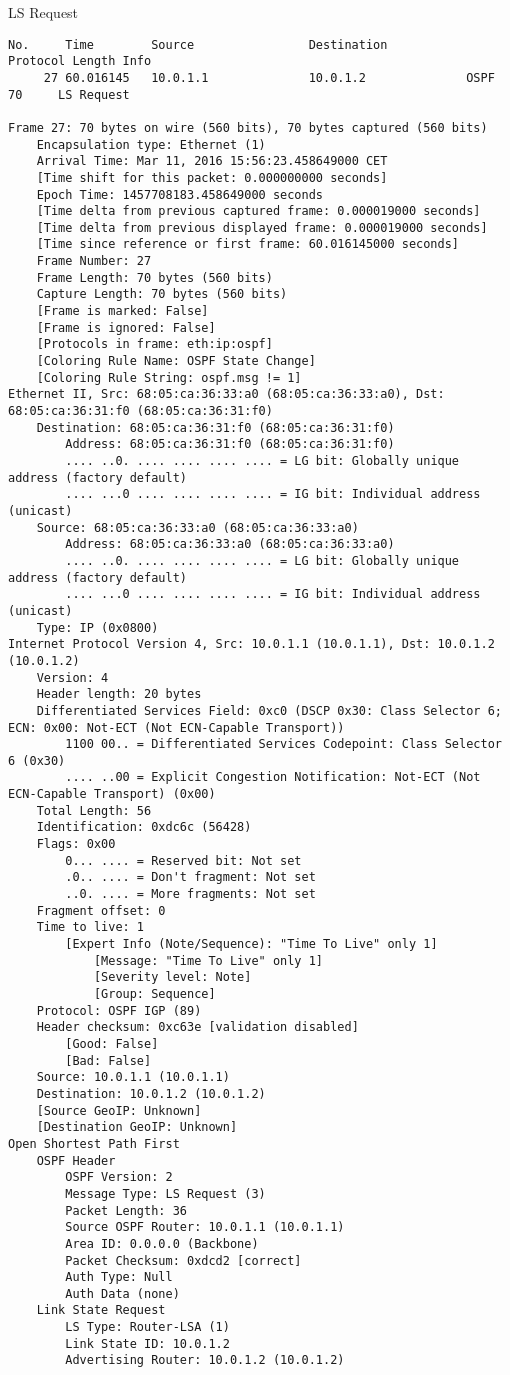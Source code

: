LS Request
\begin{lstlisting}
No.     Time        Source                Destination           Protocol Length Info
     27 60.016145   10.0.1.1              10.0.1.2              OSPF     70     LS Request

Frame 27: 70 bytes on wire (560 bits), 70 bytes captured (560 bits)
    Encapsulation type: Ethernet (1)
    Arrival Time: Mar 11, 2016 15:56:23.458649000 CET
    [Time shift for this packet: 0.000000000 seconds]
    Epoch Time: 1457708183.458649000 seconds
    [Time delta from previous captured frame: 0.000019000 seconds]
    [Time delta from previous displayed frame: 0.000019000 seconds]
    [Time since reference or first frame: 60.016145000 seconds]
    Frame Number: 27
    Frame Length: 70 bytes (560 bits)
    Capture Length: 70 bytes (560 bits)
    [Frame is marked: False]
    [Frame is ignored: False]
    [Protocols in frame: eth:ip:ospf]
    [Coloring Rule Name: OSPF State Change]
    [Coloring Rule String: ospf.msg != 1]
Ethernet II, Src: 68:05:ca:36:33:a0 (68:05:ca:36:33:a0), Dst: 68:05:ca:36:31:f0 (68:05:ca:36:31:f0)
    Destination: 68:05:ca:36:31:f0 (68:05:ca:36:31:f0)
        Address: 68:05:ca:36:31:f0 (68:05:ca:36:31:f0)
        .... ..0. .... .... .... .... = LG bit: Globally unique address (factory default)
        .... ...0 .... .... .... .... = IG bit: Individual address (unicast)
    Source: 68:05:ca:36:33:a0 (68:05:ca:36:33:a0)
        Address: 68:05:ca:36:33:a0 (68:05:ca:36:33:a0)
        .... ..0. .... .... .... .... = LG bit: Globally unique address (factory default)
        .... ...0 .... .... .... .... = IG bit: Individual address (unicast)
    Type: IP (0x0800)
Internet Protocol Version 4, Src: 10.0.1.1 (10.0.1.1), Dst: 10.0.1.2 (10.0.1.2)
    Version: 4
    Header length: 20 bytes
    Differentiated Services Field: 0xc0 (DSCP 0x30: Class Selector 6; ECN: 0x00: Not-ECT (Not ECN-Capable Transport))
        1100 00.. = Differentiated Services Codepoint: Class Selector 6 (0x30)
        .... ..00 = Explicit Congestion Notification: Not-ECT (Not ECN-Capable Transport) (0x00)
    Total Length: 56
    Identification: 0xdc6c (56428)
    Flags: 0x00
        0... .... = Reserved bit: Not set
        .0.. .... = Don't fragment: Not set
        ..0. .... = More fragments: Not set
    Fragment offset: 0
    Time to live: 1
        [Expert Info (Note/Sequence): "Time To Live" only 1]
            [Message: "Time To Live" only 1]
            [Severity level: Note]
            [Group: Sequence]
    Protocol: OSPF IGP (89)
    Header checksum: 0xc63e [validation disabled]
        [Good: False]
        [Bad: False]
    Source: 10.0.1.1 (10.0.1.1)
    Destination: 10.0.1.2 (10.0.1.2)
    [Source GeoIP: Unknown]
    [Destination GeoIP: Unknown]
Open Shortest Path First
    OSPF Header
        OSPF Version: 2
        Message Type: LS Request (3)
        Packet Length: 36
        Source OSPF Router: 10.0.1.1 (10.0.1.1)
        Area ID: 0.0.0.0 (Backbone)
        Packet Checksum: 0xdcd2 [correct]
        Auth Type: Null
        Auth Data (none)
    Link State Request
        LS Type: Router-LSA (1)
        Link State ID: 10.0.1.2
        Advertising Router: 10.0.1.2 (10.0.1.2)
\end{lstlisting}
